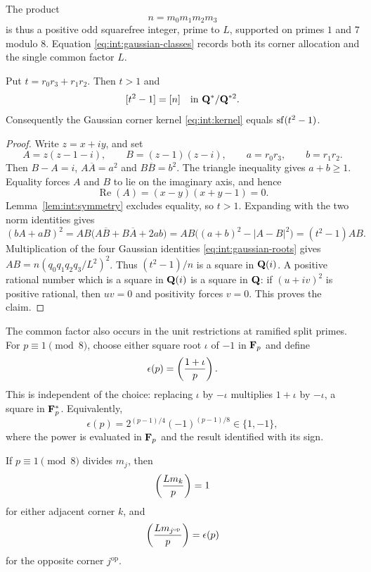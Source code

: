 The product
\begin{equation}\label{eq:int:kernel}
 n=m_0m_1m_2m_3
\end{equation}
is thus a positive odd squarefree integer, prime to $L$, supported on
primes $1$ and $7$ modulo $8$. Equation
\eqref{eq:int:gaussian-classes} records both its corner allocation
and the single common factor $L$.

\begin{proposition}\label{prop:int:kernel-product}
Put $t=r_0r_3+r_1r_2$. Then $t>1$ and
\[
 [t^2-1]=[n]\quad\text{in }\Q^*/\Q^{*2}.
\]
Consequently the Gaussian corner kernel \eqref{eq:int:kernel} equals
$\sf(t^2-1)$.
\end{proposition}
\begin{proof}
Write $z=x+iy$, and set
\[
 A=z(z-1-i),\qquad B=(z-1)(z-i),\qquad
 a=r_0r_3,\qquad b=r_1r_2.
\]
Then $B-A=i$, $A\overline A=a^2$ and $B\overline B=b^2$.
The triangle inequality gives $a+b\geq1$. Equality forces $A$ and $B$
to lie on the imaginary axis, and hence
\[
 \operatorname{Re}(A)=(x-y)(x+y-1)=0.
\]
Lemma~\ref{lem:int:symmetry} excludes equality, so $t>1$.
Expanding with the two norm identities gives
\[
 (bA+aB)^2
 =AB\bigl(A\overline B+B\overline A+2ab\bigr)
 =AB\bigl((a+b)^2-|A-B|^2\bigr)
 =(t^2-1)AB.
\]
Multiplication of the four Gaussian identities
\eqref{eq:int:gaussian-roots} gives
$AB=n(q_0q_1q_2q_3/L^2)^2$. Thus $(t^2-1)/n$ is a square
in $\Q(i)$. A positive rational number which is a square in
$\Q(i)$ is a square in $\Q$: if $(u+iv)^2$ is positive rational,
then $uv=0$ and positivity forces $v=0$. This proves the claim.
\end{proof}

The common factor also occurs in the unit restrictions at ramified
split primes. For $p\equiv1\pmod8$, choose either square root
$\iota$ of $-1$ in $\F_p$ and define
\[
 \epsilon(p)=\leg{1+\iota}{p}.
\]
This is independent of the choice: replacing $\iota$ by $-\iota$
multiplies $1+\iota$ by $-\iota$, a square in $\F_p^*$.
Equivalently,
\begin{equation}\label{eq:int:quartic-sign}
 \epsilon(p)=2^{(p-1)/4}(-1)^{(p-1)/8}\in\{1,-1\},
\end{equation}
where the power is evaluated in $\F_p$ and the result identified
with its sign.

\begin{proposition}\label{prop:int:ramified-units}
If $p\equiv1\pmod8$ divides $m_j$, then
\[
 \leg{Lm_k}{p}=1
\]
for either adjacent corner $k$, and
\[
 \leg{Lm_{j^{\mathrm{op}}}}p=\epsilon(p)
\]
for the opposite corner $j^{\mathrm{op}}$.
\end{proposition}

